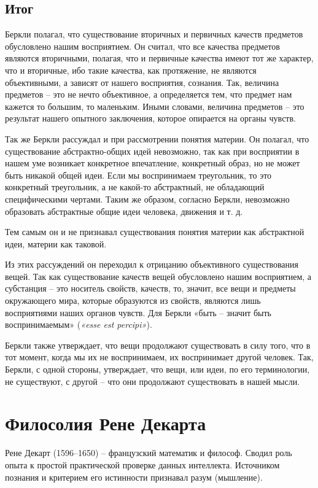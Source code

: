 \documentclass[a4paper, 14pt]{extreport}
\begin{document}
\subsection{Итог}

Беркли полагал, что существование вторичных и первичных качеств
предметов обусловлено нашим восприятием. Он считал, что все качества
предметов являются вторичными, полагая, что и первичные качества имеют
тот же характер, что и вторичные, ибо такие качества, как протяжение, не
являются объективными, а зависят от нашего восприятия, сознания. Так,
величина предметов -- это не нечто объективное, а определяется тем, что
предмет нам кажется то большим, то маленьким. Иными словами, величина
предметов -- это результат нашего опытного заключения, которое опирается
на органы чувств.

Так же Беркли рассуждал и при рассмотрении понятия материи. Он полагал,
что существование абстрактно-общих идей невозможно, так как при
восприятии в нашем уме возникает конкретное впечатление, конкретный
образ, но не может быть никакой общей идеи. Если мы воспринимаем
треугольник, то это конкретный треугольник, а не какой-то абстрактный,
не обладающий специфическими чертами. Таким же образом, согласно Беркли,
невозможно образовать абстрактные общие идеи человека, движения и т. д.

Тем самым он и не признавал существования понятия материи как
абстрактной идеи, материи как таковой.

Из этих рассуждений он переходил к отрицанию объективного существования
вещей. Так как существование качеств вещей обусловлено нашим
восприятием, а субстанция -- это носитель свойств, качеств, то, значит,
все вещи и предметы окружающего мира, которые образуются из свойств,
являются лишь восприятиями наших органов чувств. Для Беркли «быть --
значит быть воспринимаемым» (\emph{«esse est percipi»}).

Беркли также утверждает, что вещи продолжают существовать в силу того,
что в тот момент, когда мы их не воспринимаем, их воспринимает другой
человек. Так, Беркли, с одной стороны, утверждает, что вещи, или идеи,
по его терминологии, не существуют, с другой -- что они продолжают
существовать в нашей мысли.

\section{Филосолия Рене Декарта}

Рене Декарт (1596--1650) -- французский математик и философ. Сводил роль
опыта к простой практической проверке данных интеллекта. Источником
познания и критерием его истинности признавал разум (мышление).
\end{document}
